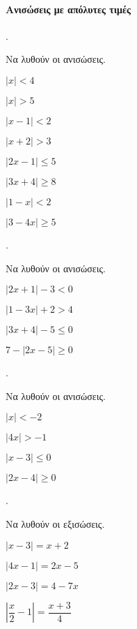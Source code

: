 \documentclass[11pt,a4paper,twocolumn]{article}
\newcounter{askhsh}
\newcommand{\askhsh}{{\large\theaskhsh.}\ \addtocounter{askhsh}{1}}
\begin{document}
\paragraph{Ανισώσεις με απόλυτες τιμές}
\askhsh Να λυθούν οι ανισώσεις.
\begin{multicols}{2}
\begin{alist}
\item $ \left|x\right|<4 $
\item $ \left|x\right|>5 $
\item $ \left|x-1\right|<2 $
\item $ \left|x+2\right|>3 $
\item $ \left|2x-1\right|\leq5 $
\item $ \left|3x+4\right|\geq8 $
\item $ \left|1-x\right|<2 $
\item $ \left|3-4x\right|\geq5 $
\end{alist}
\end{multicols}
\askhsh Να λυθούν οι ανισώσεις.
\begin{multicols}{2}
\begin{alist}
\item $ \left|2x+1\right|-3<0 $
\item $ \left|1-3x\right|+2>4 $
\item $ \left|3x+4\right|-5\leq0 $
\item $ 7-\left|2x-5\right|\geq0 $
\end{alist}
\end{multicols}
\askhsh Να λυθούν οι ανισώσεις.
\begin{multicols}{2}
\begin{alist}
\item $ \left|x\right|<-2 $
\item $ \left|4x\right|>-1 $
\item $ \left|x-3\right|\leq0 $
\item $ \left|2x-4\right|\geq0 $
\end{alist}
\end{multicols}
\askhsh Να λυθούν οι εξισώσεις.
\begin{multicols}{2}
\begin{alist}
\item $ \left|x-3\right|=x+2 $
\item $ \left|4x-1\right|=2x-5 $
\item $ \left|2x-3\right|=4-7x $
\item $ \left|\dfrac{x}{2}-1\right|=\dfrac{x+3}{4} $
\end{alist}
\end{multicols}
\end{document}
